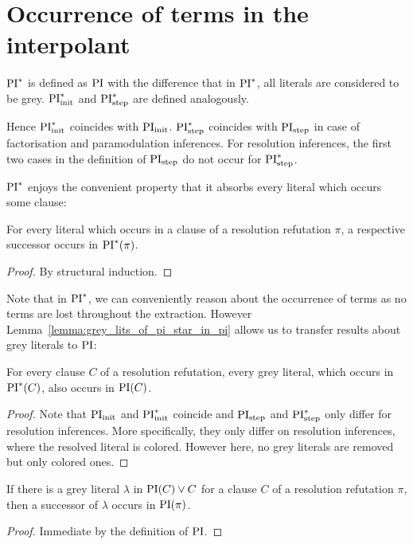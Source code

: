 \documentclass[%
	draft=false,%
	numbers=noendperiod,%
	11pt,%
	a4paper,%
	oneside,%
	openany,%
]{memoir}
\begin{document}
\section{Occurrence of terms in the interpolant}


\begin{defi}[$\PI^*$]
	$\PI^*$ is defined as $\operatorname{PI}$ with the difference that in $\PI^*$, all literals are considered to be grey.
	$\operatorname{PI}_{\mathrm{init}}^*$ and $\operatorname{PI}_{\mathrm{step}}^*$ are defined analogously.
\end{defi}

Hence $\operatorname{PI}_{\mathrm{init}}^*$ coincides with $\operatorname{PI}_{\mathrm{init}}$.
$\operatorname{PI}_{\mathrm{step}}^*$ coincides with $\operatorname{PI}_{\mathrm{step}}$ in case of factorisation and paramodulation inferences.
For resolution inferences, the first two cases in the definition of $\operatorname{PI}_{\mathrm{step}}$ do not occur for $\operatorname{PI}_{\mathrm{step}}^*$.

$\PI^*$ enjoys the convenient property that it absorbs every literal which occurs some clause:

\begin{prop}
	\label{prop:every_lit_in_pi_star}
	For every literal which occurs in a clause of a resolution refutation $\pi$, a respective successor occurs in $\operatorname{PI}^*(\pi)$.
\end{prop}
\begin{proof}
	By structural induction.
\end{proof}

Note that in $\PI^*$, we can conveniently reason about the occurrence of terms as no terms are lost throughout the extraction.
However Lemma~\ref{lemma:grey_lits_of_pi_star_in_pi} allows us to transfer results about grey literals to $\operatorname{PI}$:

\begin{lemma}
	\label{lemma:grey_lits_of_pi_star_in_pi}
	For every clause $C$ of a resolution refutation,
	every grey literal, which occurs in $\operatorname{PI}^*(C)$, also occurs in $\operatorname{PI}(C)$.
\end{lemma}
\begin{proof}
	Note that $\operatorname{PI}_{\mathrm{init}}$ and $\operatorname{PI}_{\mathrm{init}}^*$ coincide and $\operatorname{PI}_{\mathrm{step}}$ and $\operatorname{PI}_{\mathrm{step}}^*$ only differ for resolution inferences.
	More specifically, they only differ on resolution inferences, where the resolved literal is colored. However here, no grey literals are removed but only colored ones.
\end{proof}


\begin{lemma}
	\label{lemma:grey_lits_all_in_PI}
	If there is a grey literal $\lambda$ in $\operatorname{PI}(C) \lor C$ for a clause $C$ of a resolution refutation $\pi$,
	then a successor of $\lambda$ occurs in $\operatorname{PI}(\pi)$.
\end{lemma}
\begin{proof}
	Immediate by the definition of $\operatorname{PI}$.
\end{proof}
\end{document}
